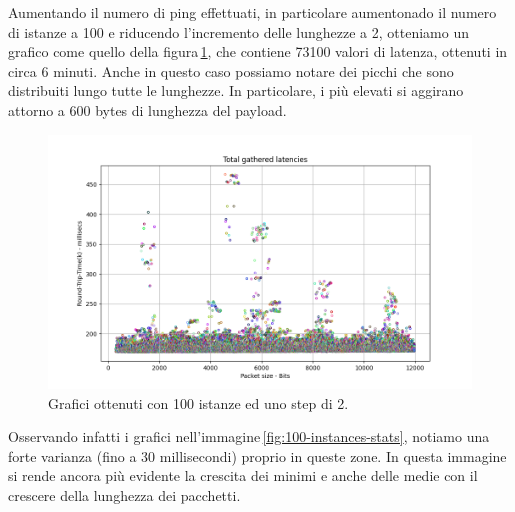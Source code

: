 \FloatBarrier\noindent Aumentando il numero di ping effettuati, in particolare aumentonado il numero di istanze a 100 e riducendo l'incremento delle lunghezze a 2, otteniamo un grafico come quello della figura\,\ref{fig:100-instances-total}, che contiene 73100 valori di latenza, ottenuti in circa 6 minuti. Anche in questo caso possiamo notare dei picchi che sono distribuiti lungo tutte le lunghezze. In particolare, i più elevati si aggirano attorno a 600 bytes di lunghezza del payload. 
\begin{figure}[h]
    \centering
    \includegraphics[width = .9\textwidth]{hw-2/report/imgs/100-instances/la-total-latencies.png}
    \caption{Grafici ottenuti con 100 istanze ed uno step di 2.}
    \label{fig:100-instances-total}
\end{figure}
Osservando infatti i grafici nell'immagine\,\ref{fig:100-instances-stats}, notiamo una forte varianza (fino a 30 millisecondi) proprio in queste zone. In questa immagine si rende ancora più evidente la crescita dei minimi e anche delle medie con il crescere della lunghezza dei pacchetti.
